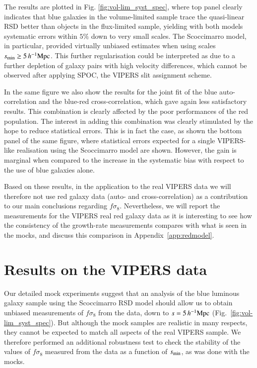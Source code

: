 \documentclass[longauth]{aa}
\def\mhmpc{\,h^{-1}{\rm Mpc}}
\begin{document}
The results are plotted in Fig. \ref{fig:vol-lim_syst_spec}, where top panel clearly indicates that blue galaxies in the volume-limited sample trace the quasi-linear RSD better than objects in the flux-limited sample, yielding with both models systematic errors within $5\%$ down to very small scales. The Scoccimarro model, in particular, provided virtually unbiased estimates when using scales $s_{\rm{min}}\ge 5\mhmpc$. This further regularisation could be interpreted as due to a further depletion of galaxy pairs with high velocity differences, which cannot be observed after applying SPOC, the VIPERS slit assignment scheme. 

In the same figure we also show the results for the joint fit of the blue auto-correlation and the blue-red cross-correlation, which gave again less satisfactory results. This combination is clearly affected by the poor performances of the red population. The interest in adding this combination was clearly stimulated by the hope to reduce statistical errors. This is in fact the case, as shown the bottom panel of the same figure, where statistical errors expected for a single VIPERS-like realisation using the Scoccimarro model are shown.  However, the gain is marginal when compared to the increase in the systematic bias with respect to the use of blue galaxies alone. 

Based on these results, in the application to the real VIPERS data we will therefore not use red galaxy data (auto- and cross-correlation) as a contribution to our main conclusions regarding $f\sigma_8$. Nevertheless, we will report the measurements for the VIPERS real red galaxy data as it is interesting to see how the consistency of the growth-rate measurements compares with what is seen in the mocks, and discuss this comparison in Appendix~\ref{app:redmodel}.







\section{Results on the VIPERS data}\label{sec:results}
  
Our detailed mock experiments suggest that an analysis of the blue luminous galaxy sample using the Scoccimarro RSD model should allow us to obtain unbiased measurements of $f\sigma_8$ from the data, down to $s=5\mhmpc$ (Fig.~\ref{fig:vol-lim_syst_spec}). But although the mock samples are realistic in many respects, they cannot be expected to match all aspects of the real VIPERS sample. We therefore performed an additional robustness test to check the stability of the values of $f\sigma_8$ measured from the data as a function of $s_{\rm{min}}$, as was done with the mocks.
\end{document}
